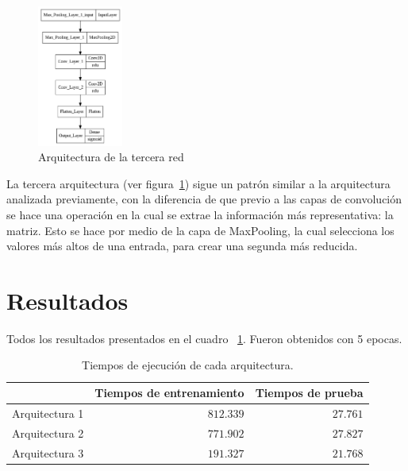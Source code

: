 \documentclass[conference, spanish, english]{IEEEtran}
\begin{document}
\begin{figure}[H]
\centering
\includegraphics[width=0.25\textwidth]{architecture/architecture_4.png}
\caption{Arquitectura de la tercera red}
\label{fig:arquitectura3}
\end{figure}

La tercera arquitectura (ver figura~\ref{fig:arquitectura3}) sigue un patrón similar a la arquitectura analizada previamente, con la diferencia de que previo a las capas de convolución se hace una operación en la cual se extrae la información más representativa: la matriz. Esto se hace por medio de la capa de MaxPooling, la cual selecciona los valores más altos de una entrada, para crear una segunda más reducida.

\section{Resultados}

Todos los resultados presentados en el cuadro ~\ref{tab:tiemposEjecucionComparacion}. Fueron obtenidos con 5 epocas.

\begin{table}[H]
\caption{Tiempos de ejecución de cada arquitectura.\label{tab:tiemposEjecucionComparacion}}

\begin{tabular}{lrr}
\toprule 
 
\cmidrule{2-3} 
 &  \multicolumn{1}{c}{Tiempos de entrenamiento}
  & \multicolumn{1}{c}{Tiempos de prueba}
 \tabularnewline
\midrule 

Arquitectura 1 & $812.339$ & $27.761$  \tabularnewline
\midrule

Arquitectura 2 & $771.902$ & $27.827$  \tabularnewline
\midrule

Arquitectura 3 & $191.327$ & $21.768$  \tabularnewline
\midrule
\bottomrule
\end{tabular}
\end{table}
\end{document}
